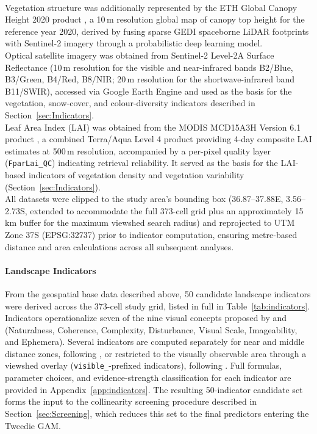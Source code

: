 \documentclass[hidelinks, 11pt]{article}
\begin{document}
\\
Vegetation structure was additionally represented by the ETH Global Canopy Height 2020 product \citep{lang_highresolution_2023}, a 10\,m resolution global map of canopy top height for the reference year 2020, derived by fusing sparse GEDI spaceborne LiDAR footprints with Sentinel-2 imagery through a probabilistic deep learning model.
\\
Optical satellite imagery was obtained from Sentinel-2 Level-2A Surface Reflectance (10\,m resolution for the visible and near-infrared bands B2/Blue, B3/Green, B4/Red, B8/NIR; 20\,m resolution for the shortwave-infrared band B11/SWIR), accessed via Google Earth Engine and used as the basis for the vegetation, snow-cover, and colour-diversity indicators described in Section~\ref{sec:Indicators}.
\\
Leaf Area Index (LAI) was obtained from the MODIS MCD15A3H Version 6.1 product \citep{myneni_mcd15a3h_2021}, a combined Terra/Aqua Level 4 product providing 4-day composite LAI estimates at 500\,m resolution, accompanied by a per-pixel quality layer (\texttt{FparLai\_QC}) indicating retrieval reliability. It served as the basis for the LAI-based indicators of vegetation density and vegetation variability (Section~\ref{sec:Indicators}).
\\
All datasets were clipped to the study area's bounding box (36.87--37.88\textdegree{}E, 3.56--2.73\textdegree{}S, extended to accommodate the full 373-cell grid plus an approximately 15\,km buffer for the maximum viewshed search radius) and reprojected to UTM Zone 37S (EPSG:32737) prior to indicator computation, ensuring metre-based distance and area calculations across all subsequent analyses.

\paragraph{Landscape Indicators}

From the geospatial base data described above, 50 candidate landscape indicators were derived across the 373-cell study grid, listed in full in Table~\ref{tab:indicators}. Indicators operationalize seven of the nine visual concepts proposed by \citet{tveit_key_2006} and \citet{ode_capturing_2008} (Naturalness, Coherence, Complexity, Disturbance, Visual Scale, Imageability, and Ephemera). Several indicators are computed separately for near and middle distance zones, following \citet{schirpke_predicting_2013}, or restricted to the visually observable area through a viewshed overlay (\texttt{visible\_}-prefixed indicators), following \citet{tenerelli_spatial_2017}. Full formulas, parameter choices, and evidence-strength classification for each indicator are provided in Appendix~\ref{app:indicators}. The resulting 50-indicator candidate set forms the input to the collinearity screening procedure described in Section~\ref{sec:Screening}, which reduces this set to the final predictors entering the Tweedie GAM.
\end{document}
